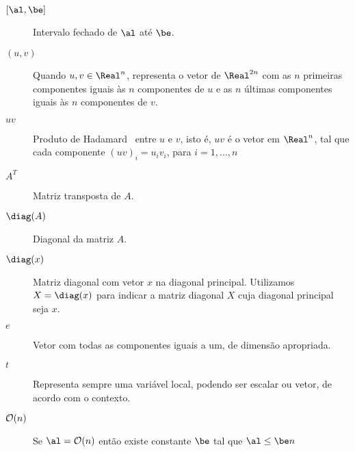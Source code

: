 \begin{description}
    \item[{$[\al, \be]$}] Intervalo fechado de $\al$ até $\be$.

    \item[$(u,v)$] Quando $u, v\in\Real^n$, representa o vetor de $\Real^{2n}$ com as $n$ primeiras componentes iguais às $n$ componentes de  $u$ e  as $n$ últimas componentes iguais às $n$ componentes de $v$.

    \item[$uv$]  Produto de Hadamard~\cite[p.~455]{Horn:1985tf} entre $u$ e $v$, 
isto é, $uv$ é o vetor em $\Real^n$, tal que cada componente  $(uv)_i  = u_iv_i$, para $i=1,\ldots,n$

    \item[$A^T$] Matriz transposta de $A$.

    \item[$\diag(A)$] Diagonal da matriz $A$. 

    \item[$\diag(x)$] Matriz diagonal com vetor $x$ na diagonal principal. Utilizamos $X = \diag(x)$ para indicar a matriz diagonal $X$ cuja diagonal principal seja $x$.
 
    \item[$e$] Vetor com todas as componentes iguais a um, de dimensão apropriada.

    \item[$t$] Representa sempre uma variável local, podendo ser escalar ou vetor, de acordo com o contexto.


    \item[$\mathcal{O}(n)$] Se $\al = \Oset(n)$ então existe constante $\be$ tal que $\al \leq \be n$

\end{description}

